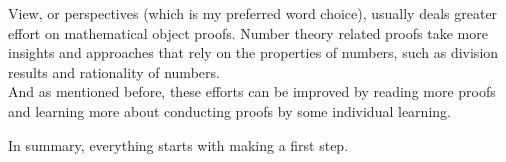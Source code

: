 \begin{bindenum}
    View, or perspectives (which is my preferred word choice), usually deals greater effort on mathematical object proofs. Number theory related proofs take more insights and approaches that rely on the properties of numbers, such as division results and rationality of numbers. \\
    And as mentioned before, these efforts can be improved by reading more proofs and learning more about conducting proofs by some individual learning.
\end{bindenum}
In summary, everything starts with making a first step.
